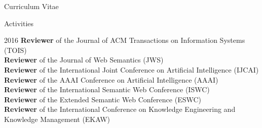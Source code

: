 \begin{cv}{\centerline{\LARGE Curriculum Vitae}}
\setlength{\cvlabelwidth}{47mm} 
  \begin{cvlist}{Activities}
  \item[2016] \textbf{Reviewer} of the Journal of ACM Transactions on Information Systems (TOIS)\\ 
  \textbf{Reviewer} of the Journal of Web Semantics (JWS)\\ 
  \textbf{Reviewer} of the International Joint Conference on Artificial Intelligence (IJCAI)\\
  \textbf{Reviewer} of the AAAI Conference on Artificial Intelligence (AAAI) \\
  \textbf{Reviewer} of the International Semantic Web Conference (ISWC) \\ 
  \textbf{Reviewer} of the Extended Semantic Web Conference (ESWC) \\ 
  \textbf{Reviewer} of the International Conference on Knowledge Engineering and Knowledge Management (EKAW) \\

\end{cvlist}
\end{cv}
